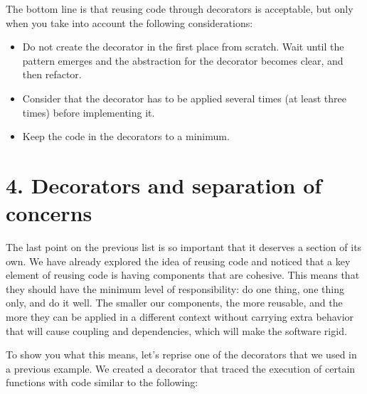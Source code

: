 \documentclass[a4paper,10pt,english]{sphinxmanual}
\begin{document}
The bottom line is that reusing code through decorators is acceptable, but only when you
take into account the following considerations:
\begin{itemize}
\item {} 
Do not create the decorator in the first place from scratch. Wait until the pattern emerges and the abstraction for the decorator becomes clear, and then refactor.

\item {} 
Consider that the decorator has to be applied several times (at least three times) before implementing it.

\item {} 
Keep the code in the decorators to a minimum.

\end{itemize}


\section{4. Decorators and separation of concerns}
\label{\detokenize{chapters/5_decorators/index:decorators-and-separation-of-concerns}}
The last point on the previous list is so important that it deserves a section of its own. We
have already explored the idea of reusing code and noticed that a key element of reusing
code is having components that are cohesive. This means that they should have the
minimum level of responsibility: do one thing, one thing only, and do it well. The smaller
our components, the more reusable, and the more they can be applied in a different context
without carrying extra behavior that will cause coupling and dependencies, which will
make the software rigid.

To show you what this means, let’s reprise one of the decorators that we used in a previous
example. We created a decorator that traced the execution of certain functions with code
similar to the following:
\end{document}

